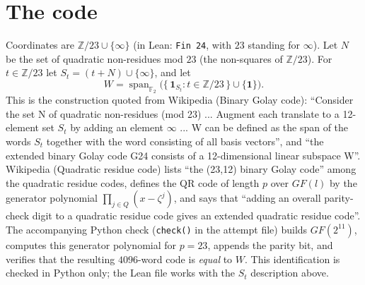 \documentclass[11pt]{article}
\begin{document}
\section*{The code}
Coordinates are $\mathbb{Z}/23 \cup \{\infty\}$ (in Lean: \texttt{Fin 24}, with $23$ standing for $\infty$). Let $N$
be the set of quadratic non-residues mod $23$ (the non-squares of $\mathbb{Z}/23$). For $t\in\mathbb{Z}/23$ let
$S_t = (t+N)\cup\{\infty\}$, and let
\[ W = \operatorname{span}_{\mathbb{F}_2}\bigl(\{\,\mathbf 1_{S_t} : t \in \mathbb{Z}/23\,\} \cup \{\mathbf 1\}\bigr). \]
This is the construction quoted from Wikipedia (Binary Golay code): ``Consider the set N of quadratic non-residues
(mod 23) ... Augment each translate to a 12-element set $S_t$ by adding an element $\infty$ ... W can be defined as the
span of the words $S_t$ together with the word consisting of all basis vectors'', and ``the extended binary Golay code
G24 consists of a 12-dimensional linear subspace W''. Wikipedia (Quadratic residue code) lists ``the (23,12) binary
Golay code'' among the quadratic residue codes, defines the QR code of length $p$ over $GF(l)$ by the generator
polynomial $\prod_{j\in Q}(x-\zeta^j)$, and says that ``adding an overall parity-check digit to a quadratic residue
code gives an extended quadratic residue code''. The accompanying Python check (\texttt{check()} in the attempt file)
builds $GF(2^{11})$, computes this generator polynomial for $p = 23$, appends the parity bit, and verifies that the
resulting $4096$-word code is \emph{equal} to $W$. This identification is checked in Python only; the Lean file works
with the $S_t$ description above.
\end{document}
